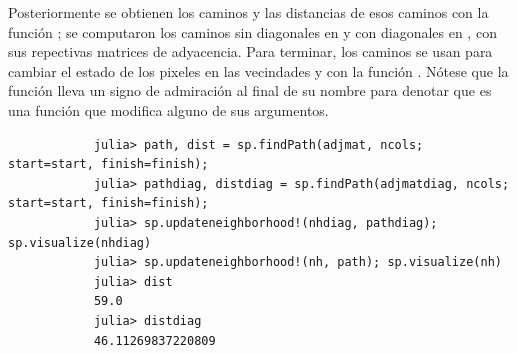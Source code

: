 \begin{enumerate}
\begin{solution}
        Posteriormente se obtienen los caminos y las distancias de esos caminos con la función ; se computaron los caminos sin diagonales en  y con diagonales en , con sus repectivas matrices de adyacencia. Para terminar, los caminos se usan para cambiar el estado de los pixeles en las vecindades  y  con la función . Nótese que la función lleva un signo de admiración \code{!} al final de su nombre para denotar que es una función que modifica alguno de sus argumentos.
        \begin{verbatim}
            julia> path, dist = sp.findPath(adjmat, ncols; start=start, finish=finish);
            julia> pathdiag, distdiag = sp.findPath(adjmatdiag, ncols; start=start, finish=finish);
            julia> sp.updateneighborhood!(nhdiag, pathdiag); sp.visualize(nhdiag)
            julia> sp.updateneighborhood!(nh, path); sp.visualize(nh)
            julia> dist
            59.0
            julia> distdiag
            46.11269837220809
        \end{verbatim}


\end{solution}
\end{enumerate}

